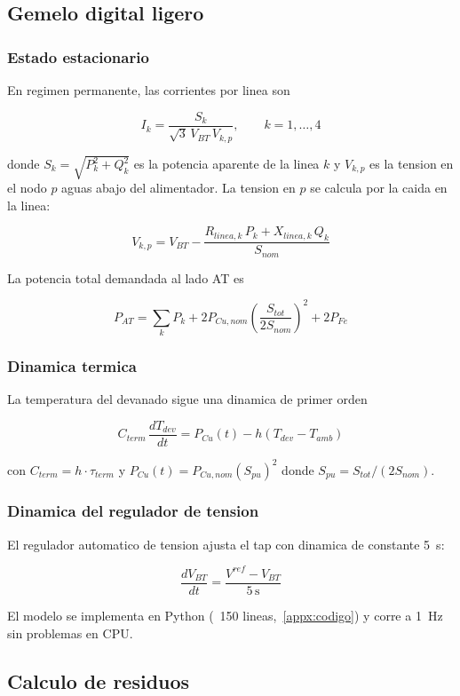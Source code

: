 \subsection{Gemelo digital ligero}

\subsubsection{Estado estacionario}

En regimen permanente, las corrientes por linea son

\[
I_k = \frac{S_k}{\sqrt{3}\, V_{BT}\, V_{k,p}}, \qquad k = 1,\dots,4
\]

donde $S_k = \sqrt{P_k^2 + Q_k^2}$ es la potencia aparente de la
linea $k$ y $V_{k,p}$ es la tension en el nodo $p$ aguas abajo del
alimentador. La tension en $p$ se calcula por la caida en la linea:

\[
V_{k,p} = V_{BT} - \frac{R_{linea,k}\, P_k + X_{linea,k}\, Q_k}{S_{nom}}
\]

La potencia total demandada al lado AT es

\[
P_{AT} = \sum_k P_k + 2 P_{Cu,nom} \left(\frac{S_{tot}}{2 S_{nom}}\right)^2 + 2 P_{Fe}
\]

\subsubsection{Dinamica termica}

La temperatura del devanado sigue una dinamica de primer orden

\[
C_{term}\, \frac{dT_{dev}}{dt} = P_{Cu}(t) - h (T_{dev} - T_{amb})
\]

con $C_{term} = h \cdot \tau_{term}$ y $P_{Cu}(t) = P_{Cu,nom} (S_{pu})^2$
donde $S_{pu} = S_{tot} / (2 S_{nom})$.

\subsubsection{Dinamica del regulador de tension}

El regulador automatico de tension ajusta el tap con dinamica de
constante 5~s:

\[
\frac{dV_{BT}}{dt} = \frac{V^{ref} - V_{BT}}{5\,\text{s}}
\]

El modelo se implementa en Python (~150 lineas,~\ref{appx:codigo})
y corre a 1~Hz sin problemas en CPU.

\subsection{Calculo de residuos}

